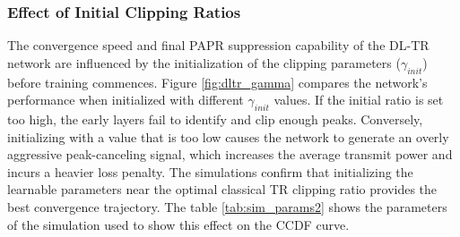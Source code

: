 \subsubsection{Effect of Initial Clipping Ratios}
The convergence speed and final PAPR suppression capability of the DL-TR network are influenced by the initialization of the clipping parameters ($\gamma_{init}$) before training commences. Figure \ref{fig:dltr_gamma} compares the network's performance when initialized with different $\gamma_{init}$ values. If the initial ratio is set too high, the early layers fail to identify and clip enough peaks. Conversely, initializing with a value that is too low causes the network to generate an overly aggressive peak-canceling signal, which increases the average transmit power and incurs a heavier loss penalty. The simulations confirm that initializing the learnable parameters near the optimal classical TR clipping ratio provides the best convergence trajectory. The table \ref{tab:sim_params2} shows the parameters of the simulation used to show this effect on the CCDF curve.

